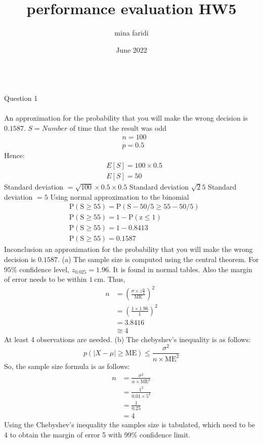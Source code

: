 \documentclass{article}
\title{performance evaluation HW5}
\author{mina faridi }
\date{June 2022}
\begin{document}
\maketitle


	\nonumber \\
Question 1\\
\\
An approximation for the probability that you will make the wrong decision is $0.1587 .$
$S=N u m b e r$ of time that the result was odd
$$
\begin{aligned}
&n=100 \\
&p=0.5
\end{aligned}
$$
Hence:
$$
\begin{aligned}
&E[S]=100 \times 0.5 \\
&E[S]=50
\end{aligned}
$$
Standard deviation $=\sqrt{100} \times 0.5 \times 0.5$
Standard deviation $\sqrt{2} 5$
Standard deviation $=5$
Using normal approximation to the binomial
$$
\begin{aligned}
&\mathrm{P}(\mathrm{S} \geq 55)=\mathrm{P}(\mathrm{S}-50 / 5 \geq 55-50 / 5) \\
&\mathrm{P}(\mathrm{S} \geq 55)=1-\mathrm{P}(\mathrm{z} \leq 1) \\
&\mathrm{P}(\mathrm{S} \geq 55)=1-0.8413 \\
&\mathrm{P}(\mathrm{S} \geq 55)=0.1587
\end{aligned}
$$
Inconclusion an approximation for the probability that you will make the wrong decision is $0.1587 .$
(a) The sample size is computed using the central theorem.
For $95 \%$ confidence level, $z_{0.025}=1.96$. It is found in normal tables. Also the margin of error needs to be within $1 \mathrm{~cm}$. Thus,
$$
\begin{aligned}
n &=\left(\frac{\sigma \times z \frac{\alpha}{2}}{\mathrm{ME}}\right)^{2} \\
&=\left(\frac{1 \times 1.96}{1}\right)^{2} \\
&=3.8416 \\
& \cong 4
\end{aligned}
$$
At least 4 observations are needed.
(b) The chebyshev's inequality is as follows:
$$
p(|X-\mu| \geq \mathrm{ME}) \leq \frac{\sigma^{2}}{n \times \mathrm{ME}^{2}}
$$
So, the sample size formula is as follows:
$$
\begin{aligned}
n &=\frac{\sigma^{2}}{\alpha \times \mathrm{ME}^{2}} \\
&=\frac{1^{2}}{0.01 \times 5^{2}} \\
&=\frac{1}{0.25} \\
&=4
\end{aligned}
$$
Using the Chebyshev's inequality the samples size is tabulated, which need to be 4 to obtain the margin of error 5 with $99 \%$ confidence limit.
\\
\\
\\
\end{document}
